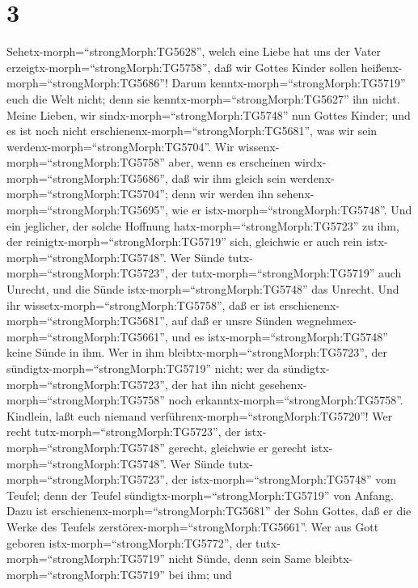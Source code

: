 \hypertarget{section-2}{%
\section{3}\label{section-2}}

 Sehetx-morph=``strongMorph:TG5628'', welch eine Liebe hat
uns der Vater erzeigtx-morph=``strongMorph:TG5758'', daß wir Gottes
Kinder sollen heißenx-morph=``strongMorph:TG5686''! Darum
kenntx-morph=``strongMorph:TG5719'' euch die Welt nicht; denn sie
kenntx-morph=``strongMorph:TG5627'' ihn nicht.  Meine
Lieben, wir sindx-morph=``strongMorph:TG5748'' nun Gottes Kinder; und es
ist noch nicht erschienenx-morph=``strongMorph:TG5681'', was wir sein
werdenx-morph=``strongMorph:TG5704''. Wir
wissenx-morph=``strongMorph:TG5758'' aber, wenn es erscheinen
wirdx-morph=``strongMorph:TG5686'', daß wir ihm gleich sein
werdenx-morph=``strongMorph:TG5704''; denn wir werden ihn
sehenx-morph=``strongMorph:TG5695'', wie er
istx-morph=``strongMorph:TG5748''.  Und ein jeglicher, der
solche Hoffnung hatx-morph=``strongMorph:TG5723'' zu ihm, der
reinigtx-morph=``strongMorph:TG5719'' sich, gleichwie er auch rein
istx-morph=``strongMorph:TG5748''.  Wer Sünde
tutx-morph=``strongMorph:TG5723'', der tutx-morph=``strongMorph:TG5719''
auch Unrecht, und die Sünde istx-morph=``strongMorph:TG5748'' das
Unrecht.  Und ihr wissetx-morph=``strongMorph:TG5758'', daß
er ist erschienenx-morph=``strongMorph:TG5681'', auf daß er unsre Sünden
wegnehmex-morph=``strongMorph:TG5661'', und es
istx-morph=``strongMorph:TG5748'' keine Sünde in ihm.  Wer
in ihm bleibtx-morph=``strongMorph:TG5723'', der
sündigtx-morph=``strongMorph:TG5719'' nicht; wer da
sündigtx-morph=``strongMorph:TG5723'', der hat ihn nicht
gesehenx-morph=``strongMorph:TG5758'' noch
erkanntx-morph=``strongMorph:TG5758''.  Kindlein, laßt euch
niemand verführenx-morph=``strongMorph:TG5720''! Wer recht
tutx-morph=``strongMorph:TG5723'', der istx-morph=``strongMorph:TG5748''
gerecht, gleichwie er gerecht istx-morph=``strongMorph:TG5748''.
 Wer Sünde tutx-morph=``strongMorph:TG5723'', der
istx-morph=``strongMorph:TG5748'' vom Teufel; denn der Teufel
sündigtx-morph=``strongMorph:TG5719'' von Anfang. Dazu ist
erschienenx-morph=``strongMorph:TG5681'' der Sohn Gottes, daß er die
Werke des Teufels zerstörex-morph=``strongMorph:TG5661''. 
Wer aus Gott geboren istx-morph=``strongMorph:TG5772'', der
tutx-morph=``strongMorph:TG5719'' nicht Sünde, denn sein Same
bleibtx-morph=``strongMorph:TG5719'' bei ihm; und
